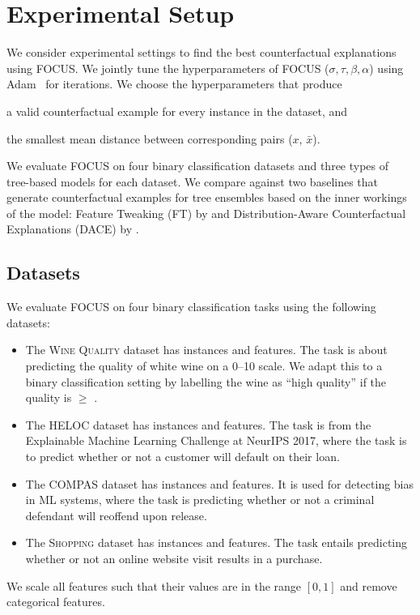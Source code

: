 
\section{Experimental Setup}
\label{section:focus-exp-setup}

We consider  experimental settings to find the best counterfactual explanations using FOCUS. 
We jointly tune the hyperparameters of FOCUS ($\sigma, \tau, \beta, \alpha$) using Adam~\citep{kingma_adam:_2017} for  iterations. 
We choose the hyperparameters that produce
\begin{enumerate*}[label=(\roman*)]
	\item a valid counterfactual example for every instance in the dataset, and
	\item the smallest mean distance between corresponding pairs ($x$, $\bar{x}$).
\end{enumerate*}

We evaluate FOCUS on four binary classification datasets and three types of tree-based models for each dataset. 
We compare against two baselines that generate counterfactual examples for tree ensembles based on the inner workings of the model: Feature Tweaking (FT) by \citet{tolomei_interpretable_2017} and Distribution-Aware Counterfactual Explanations (DACE) by \citet{kanamori_dace_2020}. 


\subsection{Datasets}
\label{section:focus-datasets}
We evaluate FOCUS on four binary classification tasks using the following datasets:
\begin{itemize}
	\item The \textsc{Wine Quality} dataset \citep{wine_2009} has  instances and  features. The task is about predicting the quality of white wine on a 0--10 scale. We adapt this to a binary classification setting by labelling the wine as ``high quality'' if the quality is $\geq$ .

	\item The \textsc{HELOC} dataset \citep{fico_2017} has  instances and  features. The task is from the Explainable Machine Learning Challenge at NeurIPS 2017, where the task is to predict whether or not a customer will default on their loan. 
	
	\item The \textsc{COMPAS} dataset \citep{compas-dataset-2017} has  instances and  features. It is used for detecting bias in ML systems, where the task is predicting whether or not a criminal defendant will reoffend upon release. 

	\item The \textsc{Shopping} dataset \citep{shoppingdataset} has  instances and  features. The task entails predicting whether or not an online website visit results in a purchase. 
\end{itemize}
We scale all features such that their values are in the range $\left[0, 1\right]$ and remove categorical features. 


